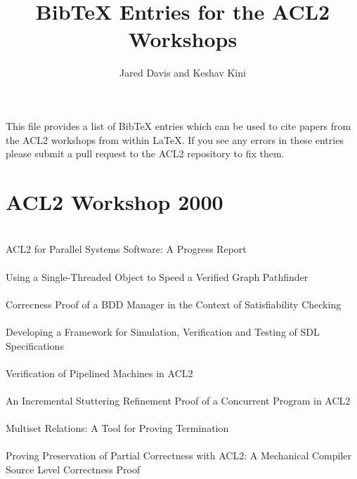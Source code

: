 \documentclass{article}
\title{BibTeX Entries for the ACL2 Workshops}
\author{Jared Davis and Keshav Kini}
\begin{document}
\maketitle

This file provides a list of BibTeX entries which can be used to cite papers
from the ACL2 workshops from within \LaTeX{}.  If you see any errors in these
entries please submit a pull request to the ACL2 repository to fix them.


\section{ACL2 Workshop 2000}

\cite{00-lusk-parallel} \\
ACL2 for Parallel Systems Software: A Progress Report \\

\cite{00-wilding-stobj} \\
Using a Single-Threaded Object to Speed a Verified Graph Pathfinder \\

\cite{00-sumners-bdds} \\
Correcness Proof of a BDD Manager in the Context of Satisfiability Checking \\

\cite{00-shumsky-sdl} \\
Developing a Framework for Simulation, Verification and Testing of SDL Specifications \\

\cite{00-manolios-pipeline} \\
Verification of Pipelined Machines in ACL2 \\

\cite{00-sumners-stuttering} \\
An Incremental Stuttering Refinement Proof of a Concurrent Program in ACL2 \\

\cite{00-reina-multiset} \\
Multiset Relations: A Tool for Proving Termination \\

\cite{00-goerigk} \\
Proving Preservation of Partial Correctness with ACL2: A Mechanical Compiler Source Level Correctness Proof \\
\end{document}
